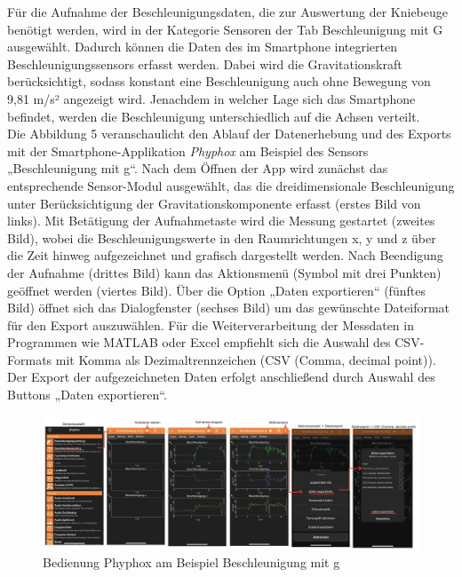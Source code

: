 \noindent Für die Aufnahme der Beschleunigungsdaten, die zur Auswertung der Kniebeuge benötigt werden, wird in der Kategorie Sensoren der Tab Beschleunigung mit G ausgewählt. Dadurch können die Daten des im Smartphone integrierten Beschleunigungssensors erfasst werden. Dabei wird die Gravitationskraft berücksichtigt, sodass konstant eine Beschleunigung auch ohne Bewegung von 9,81 m/s² angezeigt wird. \cite{Phyphox} Jenachdem in welcher Lage sich das Smartphone befindet, werden die Beschleunigung unterschiedlich auf die Achsen verteilt.
\\
\noindent Die Abbildung 5 veranschaulicht den Ablauf der Datenerhebung und des Exports mit der Smartphone-Applikation \textit{Phyphox} am Beispiel des Sensors „Beschleunigung mit g“. Nach dem Öffnen der App wird zunächst das entsprechende Sensor-Modul ausgewählt, das die dreidimensionale Beschleunigung unter Berücksichtigung der Gravitationskomponente erfasst (erstes Bild von links). Mit Betätigung der Aufnahmetaste wird die Messung gestartet (zweites Bild), wobei die Beschleunigungswerte in den Raumrichtungen x, y und z über die Zeit hinweg aufgezeichnet und grafisch dargestellt werden. Nach Beendigung der Aufnahme (drittes Bild) kann das Aktionsmenü (Symbol mit drei Punkten) geöffnet werden (viertes Bild). Über die Option „Daten exportieren“ (fünftes Bild) öffnet sich das Dialogfenster (sechses Bild) um das gewünschte Dateiformat für den Export auszuwählen. Für die Weiterverarbeitung der Messdaten in Programmen wie MATLAB oder Excel empfiehlt sich die Auswahl des CSV-Formats mit Komma als Dezimaltrennzeichen (CSV (Comma, decimal point)). Der Export der aufgezeichneten Daten erfolgt anschließend durch Auswahl des Buttons „Daten exportieren“.
\begin{figure}[ht]\centering
\includegraphics[width=\linewidth]{images/Bedienung.jpeg}
\caption{Bedienung Phyphox am Beispiel Beschleunigung mit g\cite{Phyphox}}
\label{fig:Anwenderoberfläche Phyphox}
\end{figure}
